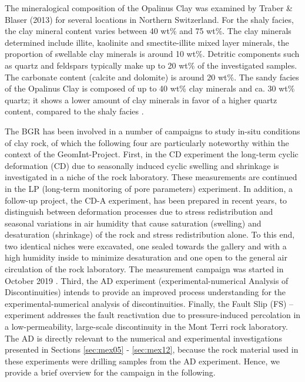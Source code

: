 The mineralogical composition of the Opalinus Clay was examined by Traber \& Blaser (2013) \cite{traber2013} for several locations in Northern Switzerland. For the shaly facies, the clay mineral content varies between 40 wt\% and 75 wt\%. The clay minerals determined include illite, kaolinite and smectite-illite mixed layer minerals, the proportion of swellable clay minerals is around 10 wt\%. Detritic components such as quartz and feldspars typically make up to 20 wt\% of the investigated samples. The carbonate content (calcite and dolomite) is around 20 wt\%. The sandy facies of the Opalinus Clay is composed of up to 40 wt\% clay minerals and ca. 30 wt\% quartz; it shows a lower amount of clay minerals in favor of a higher quartz content, compared to the shaly facies \cite{heitzmann2001}. 

The BGR has been involved in a number of campaigns to study in-situ conditions of clay rock, of which the following four are particularly noteworthy within the context of the GeomInt-Project. First, in the CD experiment the long-term cyclic deformation (CD) due to seasonally induced cyclic swelling and shrinkage is investigated in a niche of the rock laboratory. These measurements are continued in the LP (long-term monitoring of pore parameters) experiment. In addition, a follow-up project, the CD-A experiment, has been prepared in recent years, to distinguish between deformation processes due to stress redistribution and seasonal variations in air humidity that cause saturation (swelling) and desaturation (shrinkage) of the rock and stress redistribution alone. To this end, two identical niches were excavated, one sealed towards the gallery and with a high humidity inside to minimize desaturation and one open to the general air circulation of the rock laboratory. The measurement campaign was started in October 2019 \cite{ziefle2019}. Third, the AD experiment (experimental-numerical Analysis of Discontinuities) intends to provide an improved process understanding for the experimental-numerical analysis of discontinuities. Finally, the Fault Slip (FS) – experiment addresses the fault reactivation due to pressure-induced percolation in a low-permeability, large-scale discontinuity in the Mont Terri rock laboratory. The AD is directly relevant to the numerical and experimental investigations presented in Sections \ref{sec:mex05} - \ref{sec:mex12}, because the rock material used in these experiments were drilling samples from the AD experiment. Hence, we provide a brief overview for the campaign in the following. 



